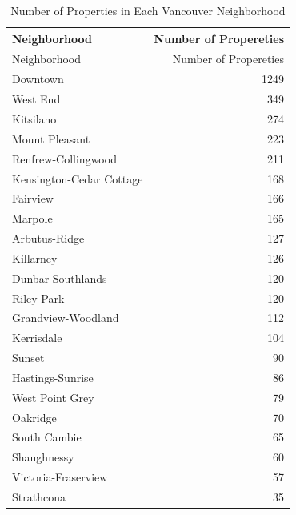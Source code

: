 \documentclass[
]{article}
\begin{document}
\begin{longtable}[]{@{}lr@{}}
\caption{Number of Properties in Each Vancouver
Neighborhood}\tabularnewline
\toprule()
Neighborhood & Number of Propereties \\
\midrule()
\endfirsthead
\toprule()
Neighborhood & Number of Propereties \\
\midrule()
\endhead
Downtown & 1249 \\
West End & 349 \\
Kitsilano & 274 \\
Mount Pleasant & 223 \\
Renfrew-Collingwood & 211 \\
Kensington-Cedar Cottage & 168 \\
Fairview & 166 \\
Marpole & 165 \\
Arbutus-Ridge & 127 \\
Killarney & 126 \\
Dunbar-Southlands & 120 \\
Riley Park & 120 \\
Grandview-Woodland & 112 \\
Kerrisdale & 104 \\
Sunset & 90 \\
Hastings-Sunrise & 86 \\
West Point Grey & 79 \\
Oakridge & 70 \\
South Cambie & 65 \\
Shaughnessy & 60 \\
Victoria-Fraserview & 57 \\
Strathcona & 35 \\
\bottomrule()
\end{longtable}
\end{document}
